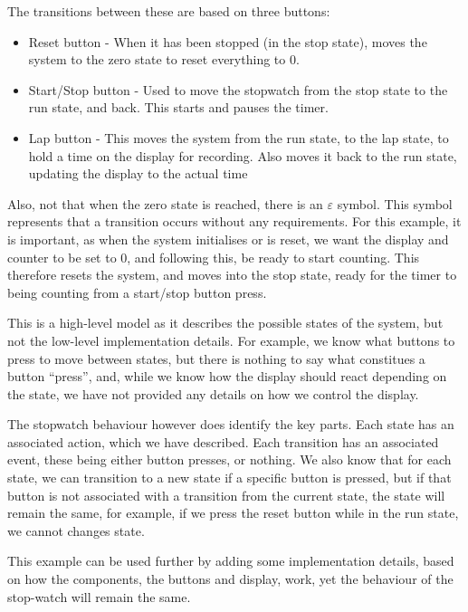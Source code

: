 \noindent The transitions between these are based on three buttons:

\begin{itemize} 

\item Reset button - When it has been stopped (in the stop state), moves the system to the zero state to reset everything to 0.

\item Start/Stop button - Used to move the stopwatch from the stop state to the run state, and back. This starts and pauses the timer. 

\item Lap button - This moves the system from the run state, to the lap state, to hold a time on the display for recording. 
                              Also moves it back to the run state, updating the display to the actual time
                              
\end{itemize}

\noindent Also, not that when the zero state is reached, there is an $\varepsilon$ symbol. This symbol represents that
a transition occurs without any requirements. For this example, it is important, as when the system initialises or is reset, we 
want the display and counter to be set to 0, and following this, be ready to start counting. This therefore resets the system, and
moves into the stop state, ready for the timer to being counting from a start/stop button press. 

This is a high-level model as it describes the possible states of the system, but not the low-level implementation details. 
For example, we know what buttons to press to move between states, but there is nothing to say what constitues a button ``press'', 
and, while we know how the display should react depending on the state, we have not provided any details on how we control the display. 

The stopwatch behaviour however does identify the key parts. Each state has an associated action, which we have described. Each transition
has an associated event, these being either button presses, or nothing. We also know that for each state, we can transition to a new state if a
specific button is pressed, but if that button is not associated with a transition from the current state, the state will remain the same, for example, 
if we press the reset button while in the run state, we cannot changes state. 

This example can be used further by adding some implementation details, based on how the components, the buttons and display, work, yet 
the behaviour of the stop-watch will remain the same. 

